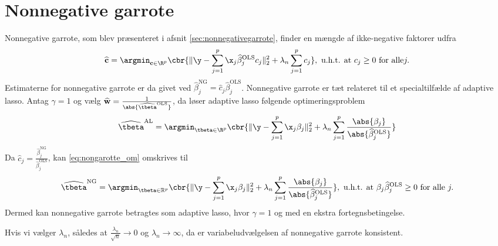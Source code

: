 \section{Nonnegative garrote} \label{sec:asymptotics_nonnegative}
Nonnegative garrote, som blev præsenteret i afsnit \ref{sec:nonnegativegarrote}, finder en mængde af ikke-negative faktorer udfra
\begin{align}
\widehat{\mathbf{c}} = \argmin_{\mathbf{c} \in \R^p} \cbr{\Vert \y - \sum_{j=1}^p \x_j \widehat{\beta}_j^\text{OLS} c_j \Vert_2^2 + \lambda_n \sum_{j=1}^p c_j}, \ \text{u.h.t. at } c_j \geq 0 \text{ for alle} j. \label{eq:nongarotte_om}
\end{align}
Estimaterne for nonnegative garrote er da givet ved \(\widehat{\beta}_j^\text{NG} = \widehat{c}_j \widehat{\beta}_j^\text{OLS}\).
Nonnegative garrote er tæt relateret til et specialtilfælde af adaptive lasso.
Antag \(\gamma=1\) og vælg \(\widehat{\mathbf{w}}=\frac{1}{\abs{ \widehat{\tbeta}^{\text{OLS}} }}\), da løser adaptive lasso følgende optimeringsproblem
\begin{align}
\widehat{\tbeta}^\text{AL} = \argmin_{\tbeta \in \R^p} \cbr{ \Vert \y - \sum_{j=1}^p \x_j \beta_j \Vert_2^2 + \lambda_n \sum_{j=1}^p \frac{\abs{ \beta_j }}{\abs{ \widehat{\beta}_j^\text{OLS}}}} \label{eq:AL8}
\end{align}
Da \(\widehat{c}_j = \frac{\widehat{\beta}_j^\text{NG}}{\widehat{\beta}_j^\text{OLS}}\), kan \eqref{eq:nongarotte_om} omskrives til
\begin{align*}
\widehat{\tbeta}^\text{NG} =\argmin_{\tbeta \in \mathbb{R}^p}  \cbr{ \Vert \y - \sum_{j=1}^p \x_j \beta_j \Vert_2^2 + \lambda_n \sum_{j=1}^p  \frac{\abs{ \beta_j}}{\abs{\widehat{\beta}_j^\text{OLS}}}}, \ \text{u.h.t. at } \beta_j \widehat{\beta}_j^\text{OLS} \geq 0 \text{ for alle } j.
\end{align*}
Dermed kan nonnegative garrote betragtes som adaptive lasso, hvor \(\gamma=1\) og med en ekstra fortegnsbetingelse.
%
\begin{cor}
Hvis vi vælger \(\lambda_n\), således at \(\frac{\lambda_n}{\sqrt{n}} \rightarrow 0\) og \(\lambda_n \rightarrow \infty\), da er variabeludvælgelsen af nonnegative garrote konsistent.
\end{cor}
%
